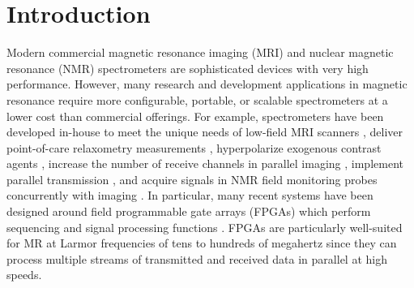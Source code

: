 \documentclass[10pt,letterpaper]{article}
\begin{document}
\section*{Introduction}
Modern commercial magnetic resonance imaging (MRI) and nuclear magnetic resonance (NMR) spectrometers are sophisticated devices with very high performance. 
However, many research and development applications in magnetic resonance require more configurable, portable, or scalable spectrometers at a lower cost than commercial offerings.
For example, spectrometers have been developed in-house to meet the unique needs of low-field MRI scanners \cite{jie:hbmr:2005,wright:2002},
deliver point-of-care relaxometry measurements \cite{peng:domp:2012},
hyperpolarize exogenous contrast agents \cite{parnell:dpns:2008},
increase the number of receive channels in parallel imaging \cite{bodurka:smmd:2004,tang:adrm:2012,stang:medusa:2012},
implement parallel transmission \cite{stang:medusa:2012,Toronto145,4915785},
and acquire signals in NMR field monitoring probes concurrently with imaging \cite{barmet:atrs:2009,sipila:2HTR:2011,sipila:dmrf:2009}. 
In particular, many recent systems have been designed around field programmable gate arrays (FPGAs) which perform sequencing and signal processing functions \cite{gengying:dnmr:2001,jie:hbmr:2005,takeda:ahif:2007,opencorenmr,tang:2011,peng:domp:2012,stang:medusa:2012}.
FPGAs are particularly well-suited for MR at Larmor frequencies of tens to hundreds of megahertz
since they can process multiple streams of transmitted and received data in parallel at high speeds.
\end{document}
